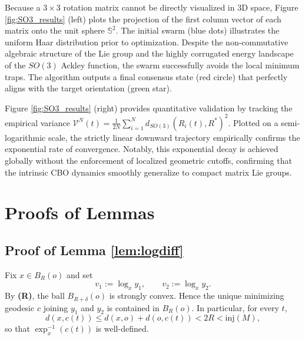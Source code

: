 \documentclass[11pt]{amsart}
\newcommand{\p}{o}%
\newcommand{\dist}{d}%
\newcommand{\inj}{\mathrm{inj}}%
\begin{document}
Because a $3 \times 3$ rotation matrix cannot be directly visualized in 3D space, Figure \ref{fig:SO3_results} (left) plots the projection of the first column   vector of each matrix onto the unit sphere $\mathbb{S}^2$. The initial swarm (blue dots) illustrates the uniform Haar distribution prior to optimization. Despite the non-commutative algebraic structure of the Lie group and the highly corrugated energy landscape of the $SO(3)$ Ackley function, the swarm successfully avoids the local minimum traps. The algorithm outputs a final consensus state (red circle) that perfectly   aligns with the target orientation (green star).

Figure \ref{fig:SO3_results} (right) provides quantitative validation by tracking the empirical variance $\mathcal{V}^N(t) = \frac{1}{2N} \sum_{i=1}^N d_{SO(3)}(R_i(t), R^*)^2$. Plotted on a semi-logarithmic scale, the strictly linear downward trajectory empirically confirms the exponential rate of convergence. Notably, this exponential decay is achieved globally without the enforcement of localized geometric cutoffs, confirming that the intrinsic CBO dynamics smoothly generalize to compact matrix Lie groups. %

\newpage

\def\url#1{}



\appendix
\section{Proofs of Lemmas} \label{sec:app.A}
\setcounter{equation}{0}
\subsection{Proof of Lemma \ref{lem:logdiff}}\label{proof:lem:logdiff}
Fix $x\in B_R(\p)$ and set
\[
v_1:=\log_x y_1,\qquad v_2:=\log_x y_2.
\]
By \textbf{(R)}, the ball $B_{R+\delta}(\p)$ is strongly convex. Hence the unique minimizing geodesic $c$ joining $y_1$ and $y_2$ is contained in $B_R(\p)$. In particular, for every $t$,
\[
\dist(x,c(t))\le \dist(x,\p)+\dist(\p,c(t))<2R<\inj(M),
\]
so that $\exp_x^{-1}(c(t))$ is well-defined.
\end{document}
